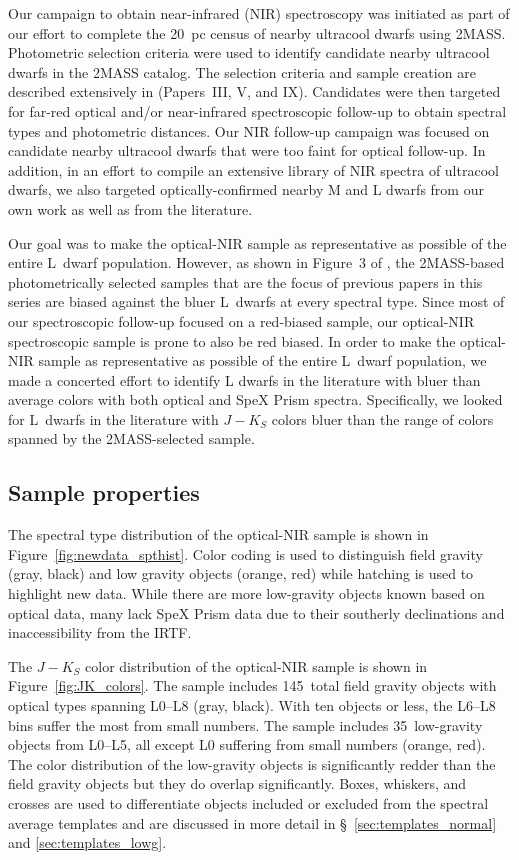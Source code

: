 \documentclass[12pt,preprint]{aastex}
\newcommand{\optNormal}{145}
\newcommand{\optLowG}{35}
\begin{document}
Our campaign to obtain near-infrared (NIR) spectroscopy was initiated as part of our effort to complete the 20~pc census of nearby ultracool dwarfs using 2MASS. Photometric selection criteria were used to identify candidate nearby ultracool dwarfs in the 2MASS catalog. The selection criteria and sample creation are described extensively in \cite{Cruz03,Cruz07,Reid08} (Papers~III, V, and IX). Candidates were then targeted for far-red optical and/or near-infrared spectroscopic follow-up to obtain spectral types and photometric distances. Our NIR follow-up campaign was focused on candidate nearby ultracool dwarfs that were too faint for optical follow-up. In addition, in an effort to compile an extensive library of NIR spectra of ultracool dwarfs, we also targeted optically-confirmed nearby M and L dwarfs from our own work as well as from the literature. 

Our goal was to make the optical-NIR sample as representative as possible of the entire L~dwarf population. 
However, as shown in Figure~3 of \cite{Schmidt10}, the 2MASS-based photometrically selected samples that are the focus of previous papers in this series \citep{Cruz03, Reid08} are biased against the bluer L~dwarfs at every spectral type. 
Since most of our spectroscopic follow-up focused on a red-biased sample, our optical-NIR spectroscopic sample is prone to also be red biased. 
In order to make the optical-NIR sample as representative as possible of the entire L~dwarf population, we made a concerted effort to identify L dwarfs in the literature with bluer than average colors with both optical and SpeX Prism spectra.
Specifically, we looked for L~dwarfs in the literature with $J-K_S$ colors bluer than the range of colors spanned by the 2MASS-selected sample. 

\subsection{Sample properties}

The spectral type distribution of the optical-NIR sample is shown in Figure~\ref{fig:newdata_spthist}. Color coding is used to distinguish field gravity (gray, black) and low gravity objects (orange, red) while hatching is used to highlight new data.
While there are more low-gravity objects known based on optical data, many lack SpeX Prism data due to their southerly declinations and inaccessibility from the IRTF.

The $J-K_S$ color distribution of the optical-NIR sample is shown in Figure~\ref{fig:JK_colors}. 
The sample includes \optNormal~total field gravity objects with optical types spanning L0--L8 (gray, black).
With ten objects or less, the L6--L8 bins suffer the most from small numbers.
The sample includes \optLowG~low-gravity objects from L0--L5, all except L0 suffering from small numbers (orange, red).
The color distribution of the low-gravity objects is significantly redder than the field gravity objects but they do overlap significantly.
Boxes, whiskers, and crosses are used to differentiate objects included or excluded from the spectral average templates and are discussed in more detail in \S~\ref{sec:templates_normal} and \ref{sec:templates_lowg}.
\end{document}
